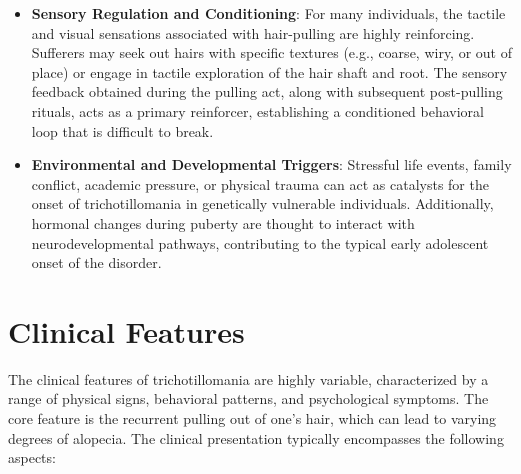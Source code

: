 \begin{itemize}
    \item \textbf{Sensory Regulation and Conditioning}: For many individuals, the tactile and visual sensations associated with hair-pulling are highly reinforcing. Sufferers may seek out hairs with specific textures (e.g., coarse, wiry, or out of place) or engage in tactile exploration of the hair shaft and root. The sensory feedback obtained during the pulling act, along with subsequent post-pulling rituals, acts as a primary reinforcer, establishing a conditioned behavioral loop that is difficult to break.
    \item \textbf{Environmental and Developmental Triggers}: Stressful life events, family conflict, academic pressure, or physical trauma can act as catalysts for the onset of trichotillomania in genetically vulnerable individuals. Additionally, hormonal changes during puberty are thought to interact with neurodevelopmental pathways, contributing to the typical early adolescent onset of the disorder.
\end{itemize}

\section*{Clinical Features}
The clinical features of trichotillomania are highly variable, characterized by a range of physical signs, behavioral patterns, and psychological symptoms. The core feature is the recurrent pulling out of one's hair, which can lead to varying degrees of alopecia. The clinical presentation typically encompasses the following aspects:

